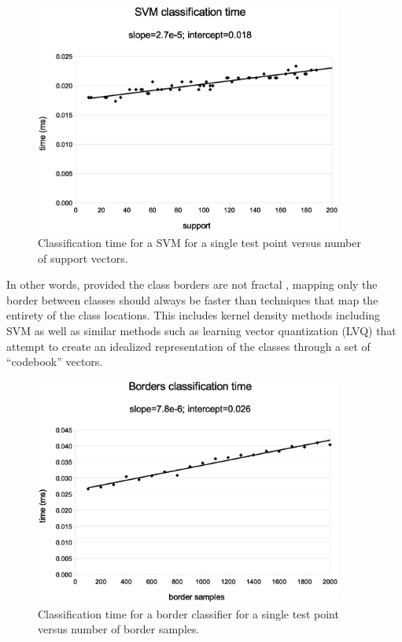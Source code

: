 \begin{figure}
\includegraphics[width=0.9\textwidth]{../svm_time}
\caption{Classification time for a SVM for a single test point versus number of support vectors.}
\label{svm_time}
\end{figure}

In other words, provided the class borders are not fractal \citep{Ott1993}, 
mapping only the border between classes should always be
faster than techniques that map the entirety of the class locations.
This includes kernel density methods including SVM as well
as similar methods such as learning vector quantization (LVQ) 
\citep{Kohonen2000,LVQ_PAK}
that attempt to create an idealized representation of the classes through
a set of ``codebook'' vectors.

\begin{figure}
\includegraphics[width=0.9\textwidth]{../border_time}
\caption{Classification time for a border classifier for a single test point versus number of border samples.}
\label{border_time}
\end{figure}

